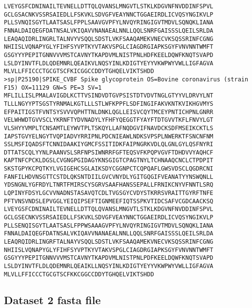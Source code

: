 \documentclass[en,black,12pt,normal]{elegantnote}
\begin{document}
\begin{lstlisting}
LVEYGSFCDNINAILTEVNELLDTTQLQVANSLMNGVTLSTKLKDGVNFNVDDINFSPVL
GCLGSACNKVSSRSAIEDLLFSKVKLSDVGFVEAYNNCTGGAEIRDLICVQSYNGIKVLP
PLLSVNQISGYTLAATSASLFPPLSAAVGVPFYLNVQYRINGIGVTMDVLSQNQKLIANA
FNNALDAIQEGFDATNSALVKIQAVVNANAEALNNLLQQLSNRFGAISSSLQEILSRLDA
LEAQAQIDRLINGRLTALNVYVSQQLSDSTLVKFSAAQAMEKVNECVKSQSSRINFCGNG
NHIISLVQNAPYGLYFIHFSYVPTKYVTAKVSPGLCIAGDRGIAPKSGYFVNVNNTWMFT
GSGYYYPEPITGNNVVVMSTCAVNYTKAPDVMLNISTPNLHDFKEELDQWFKNQTSVAPD
LSLDYINVTFLDLQDEMNRLQEAIKVLNQSYINLKDIGTYEYYVKWPWYVWLLIGFAGVA
MLVLLFFICCCTGCGTSCFKICGGCCDDYTGHQELVIKTSHDD
>sp|P25190|SPIKE_CVBF Spike glycoprotein OS=Bovine coronavirus (strain F15) OX=11129 GN=S PE=3 SV=1
MFLILLISLPMALAVIGDLKCTTVSINDVDTGVPSISTDTVDVTNGLGTYYVLDRVYLNT
TLLLNGYYPTSGSTYRNMALKGTLLLSTLWFKPPFLSDFINGIFAKVKNTKVIKHGVMYS
EFPAITIGSTFVNTSYSVVVQPHTTNLDNKLQGLLEISVCQYTMCEYPNTICHPNLGNRR
VELWHWDTGVVSCLYKRNFTYDVNADYLYFHFYQEGGTFYAYFTDTGVVTKFLFNVYLGT
VLSHYYVMPLTCNSAMTLEYWVTPLTSKQYLLAFNQDGVIFNAVDCKSDFMSEIKCKTLS
IAPSTGVYELNGYTVQPIADVYRRIPNLPDCNIEAWLNDKSVPSPLNWERKTFSNCNFNM
SSLMSFIQADSFTCNNIDAAKIYGMCFSSITIDKFAIPNGRKVDLQLGNLGYLQSFNYRI
DTTATSCQLYYNLPAANVSLSRFNPSIWNRRFGFTEQSVFKPQPVGVFTDHDVVYAQHCF
KAPTNFCPCKLDGSLCVGNGPGIDAGYKNSGIGTCPAGTNYLTCHNAAQCNCLCTPDPIT
SKSTGPYKCPQTKYLVGIGEHCSGLAIKSDYCGGNPCTCQPQAFLGWSVDSCLQGDRCNI
FANFILHDVNSGTTCSTDLQKSNTDIILGVCVNYDLYGITGQGIFVEANATYYNSWQNLL
YDSNGNLYGFRDYLTNRTFMIRSCYSGRVSAAFHANSSEPALLFRNIKCNYVFNNTLSRQ
LQPINYFDSYLGCVVNADNSTASAVQTCDLTVGSGYCVDYSTKRRSVRAITTGYRFTNFE
PFTVNSVNDSLEPVGGLYEIQIPSEFTIGNMEEFIQTSSPKVTIDCSAFVCGDCAACKSQ
LVEYGSFCDNINAILTEVNELLDTTQLQVANSLMNGVTLSTKLKDGVNFNVDDINFSPVL
GCLGSECNKVSSRSAIEDLLFSKVKLSDVGFVEAYNNCTGGAEIRDLICVQSYNGIKVLP
PLLSENQISGYTLAATSASLFPPWSAAAGVPFYLNVQYRINGIGVTMDVLSQNQKLIANA
FNNALDAIQEGFDATNSALVKIQAVVNANAEALNNLLQQLSNRFGAISSSLQEILSRLDA
LEAQRQIDRLINGRFTALNAYVSQQLSDSTLVKFSAAQAMEKVNECVKSQSSRINFCGNG
NHIISLVQNAPYGLYFIHFSYVPTKYVTAKVSPGLCIAGDRGIAPKSGYFVNVNNTWMFT
GSGYYYPEPITGNNVVVMSTCAVNYTKAPDVMLNISTPNLPDFKEELDQWFKNQTSVAPD
LSLDYINVTFLDLQDEMNRLQEAIKLLNQSYINLKDIGTYEYYVKWPWYVWLLIGFAGVA
MLVLLFFICCCTGCGTSCFKKCGGCCDDYTGHQELVIKTSHDD
\end{lstlisting}

\subsection{Dataset 2 fasta file}
\end{document}
